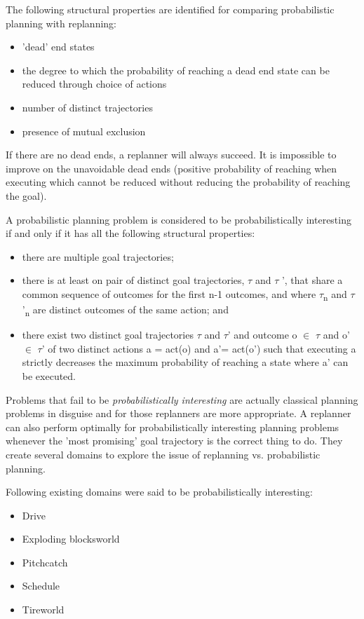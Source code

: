 \documentclass[runningheads,a4paper]{llncs}
\begin{document}
The following structural properties are identified for comparing probabilistic planning with replanning:
\begin{itemize}
	\item 'dead' end states
	\item the degree to which the probability of reaching a dead end state can be reduced through choice of actions
	\item number of distinct trajectories
	\item presence of mutual exclusion
\end{itemize}

If there are no dead ends, a replanner will always succeed. It is impossible to improve on the unavoidable dead ends (positive probability of reaching when executing which cannot be reduced without reducing the probability of reaching the goal).


A probabilistic planning problem is considered to be probabilistically interesting if and only if it has all the following structural properties:

\begin{itemize}
	\item there are multiple goal trajectories;
	\item there is at least on pair of distinct goal trajectories, $\tau$ and $\tau$ ', that share a common sequence of outcomes for the first n-1 outcomes, and where $\tau$\textsubscript{n} and $\tau$'\textsubscript{n} are distinct outcomes of the same action; and
	\item there exist two distinct goal trajectories $\tau$ and $\tau$' and outcome o $\in$ $\tau$ and o' $\in$ $\tau$' of two distinct actions a = act(o) and a'= act(o') such that executing a strictly decreases the maximum probability of reaching a state where a' can be executed.
\end{itemize}

Problems that fail to be \emph{probabilistically interesting} are actually classical planning problems in disguise and for those replanners are more appropriate. A replanner can also perform optimally for probabilistically interesting planning problems whenever the 'most promising' goal trajectory is the correct thing to do. They create several domains to explore the issue of replanning vs. probabilistic planning.

Following existing domains were said to be probabilistically interesting:
\begin{itemize}
	\item Drive
	\item Exploding blocksworld
	\item Pitchcatch
	\item Schedule
	\item Tireworld
\end{itemize}
\end{document}
